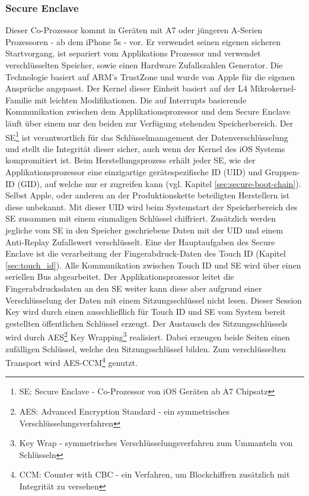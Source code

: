 	\subsubsection{Secure Enclave}\label{sec:secure_enclave}
		Dieser Co-Prozessor kommt in Geräten mit A7 oder jüngeren A-Serien
		Prozessoren - ab dem iPhone 5s - vor. Er verwendet seinen eigenen
		sicheren Startvorgang, ist separiert vom Applikations Prozessor und verwendet verschlüsselten Speicher, sowie einen
		Hardware Zufallszahlen Generator. Die Technologie basiert auf ARM's
		TrustZone\cite{TrustZone2015} und wurde von Apple für die eigenen Ansprüche
		angepasst. Der Kernel dieser Einheit basiert auf der L4
		Mikrokernel-Familie\cite{L4MicroKernel2015} mit leichten Modifikationen. Die
		auf Interrupts basierende Kommunikation zwischen dem Applikationsprozessor
		und dem Secure Enclave läuft über einem nur den beiden zur Verfügung
		stehenden Speicherbereich.
		Der SE\footnote{SE: Secure Enclave - Co-Prozessor von iOS Geräten ab A7
		Chipsatz} ist verantwortlich für das Schlüsselmanagement der
		Datenverschlüsselung und stellt die Integrität dieser sicher, auch wenn der
		Kernel des iOS Systems kompromitiert ist. Beim Herstellungsprozess erhält
		jeder SE, wie der Applikationsprozessor eine einzigartige gerätespezifische
		ID (UID) und Gruppen-ID (GID), auf welche nur er zugreifen kann (vgl. Kapitel
		\ref{sec:secure-boot-chain}).
		Selbst Apple, oder anderen an der Produktionskette beteiligten Herstellern
		ist diese unbekannt. Mit dieser UID wird beim
		Systemstart der Speicherbereich des SE zusammen mit einem einmaligen
		Schlüssel chiffriert.
		Zusätzlich werden jegliche vom SE in den Speicher geschriebene Daten mit der
		UID und einem Anti-Replay Zufallswert verschlüsselt. Eine der Hauptaufgaben
		des Secure Enclave ist die verarbeitung der Fingerabdruck-Daten des Touch ID
		(Kapitel \ref{sec:touch_id}).
		Alle Kommunikation zwischen Touch ID und SE wird über einen seriellen Bus
		abgearbeitet. Der Applikationsprozessor leitet die Fingerabdrucksdaten an den
		SE weiter kann diese aber aufgrund einer Verschlüsselung der Daten mit einem
		Sitzungsschlüssel nicht lesen. Dieser Session Key wird durch einen
		ausschließlich für Touch ID und SE vom System bereit gestellten öffentlichen
		Schlüssel erzeugt. Der Austausch des Sitzungsschlüssels wird durch
		AES\footnote{AES: Advanced Encryption Standard - ein symmetrisches
		Verschlüsselungsverfahren} Key Wrapping\footnote{Key Wrap - symmetrisches
		Verschlüsselungsverfahren zum Ummanteln von Schlüsseln} realisiert. Dabei
		erzeugen beide Seiten einen zufälligen Schlüssel, welche den
		Sitzungsschlüssel bilden. Zum verschlüsselten Transport wird
		AES-CCM\footnote{CCM: Counter with CBC - ein Verfahren, um Blockchiffren
		zusätzlich mit Integrität zu versehen} genutzt.
		
